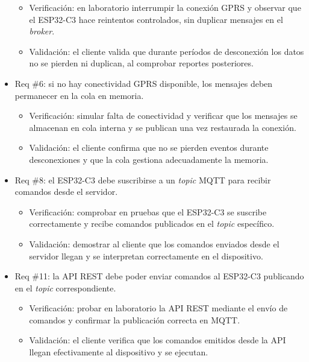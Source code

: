 \documentclass[
11pt, %
]{charter}
\begin{document}
\begin{itemize}
\begin{itemize}
	\item Verificación: en laboratorio interrumpir la conexión GPRS y observar que el ESP32-C3 hace reintentos controlados, sin duplicar mensajes en el \textit{broker}.
	\item Validación: el cliente valida que durante períodos de desconexión los datos no se pierden ni duplican, al comprobar reportes posteriores.
\end{itemize}

\item Req \#6: si no hay conectividad GPRS disponible, los mensajes deben permanecer en la cola en memoria.

\begin{itemize}
	\item Verificación: simular falta de conectividad y verificar que los mensajes se almacenan en cola interna y se publican una vez restaurada la conexión.
	\item Validación: el cliente confirma que no se pierden eventos durante desconexiones y que la cola gestiona adecuadamente la memoria.
\end{itemize}

\item Req \#8: el ESP32-C3 debe suscribirse a un \textit{topic} MQTT para recibir comandos desde el servidor.

\begin{itemize}
	\item Verificación: comprobar en pruebas que el ESP32-C3 se suscribe correctamente y recibe comandos publicados en el \textit{topic} específico.
	\item Validación: demostrar al cliente que los comandos enviados desde el servidor llegan y se interpretan correctamente en el dispositivo.
\end{itemize}

\item Req \#11: la API REST debe poder enviar comandos al ESP32-C3 publicando en el \textit{topic} correspondiente.

\begin{itemize}
	\item Verificación: probar en laboratorio la API REST mediante el envío de comandos y confirmar la publicación correcta en MQTT.
	\item Validación: el cliente verifica que los comandos emitidos desde la API llegan efectivamente al dispositivo y se ejecutan.
\end{itemize}


\end{itemize}
\end{document}
